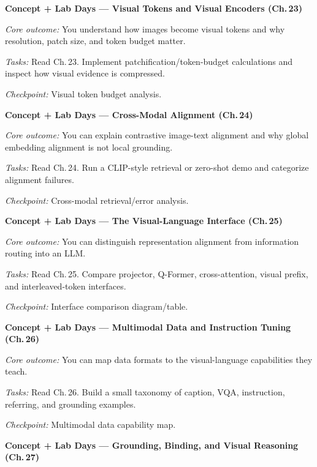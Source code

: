 \begin{description}[style=nextline, leftmargin=1.8cm, labelwidth=1.5cm]

\item[Day 59--60] \textbf{Concept + Lab Days --- Visual Tokens and Visual Encoders (Ch.\,23)}

\textit{Core outcome:} You understand how images become visual tokens and why resolution, patch size, and token budget matter.

\textit{Tasks:} Read Ch.\,23. Implement patchification/token-budget calculations and inspect how visual evidence is compressed.

\textit{Checkpoint:} Visual token budget analysis.

\item[Day 61--62] \textbf{Concept + Lab Days --- Cross-Modal Alignment (Ch.\,24)}

\textit{Core outcome:} You can explain contrastive image-text alignment and why global embedding alignment is not local grounding.

\textit{Tasks:} Read Ch.\,24. Run a CLIP-style retrieval or zero-shot demo and categorize alignment failures.

\textit{Checkpoint:} Cross-modal retrieval/error analysis.

\item[Day 63--64] \textbf{Concept + Lab Days --- The Visual-Language Interface (Ch.\,25)}

\textit{Core outcome:} You can distinguish representation alignment from information routing into an LLM.

\textit{Tasks:} Read Ch.\,25. Compare projector, Q-Former, cross-attention, visual prefix, and interleaved-token interfaces.

\textit{Checkpoint:} Interface comparison diagram/table.

\item[Day 65--66] \textbf{Concept + Lab Days --- Multimodal Data and Instruction Tuning (Ch.\,26)}

\textit{Core outcome:} You can map data formats to the visual-language capabilities they teach.

\textit{Tasks:} Read Ch.\,26. Build a small taxonomy of caption, VQA, instruction, referring, and grounding examples.

\textit{Checkpoint:} Multimodal data capability map.

\item[Day 67--69] \textbf{Concept + Lab Days --- Grounding, Binding, and Visual Reasoning (Ch.\,27)}


\end{description}
